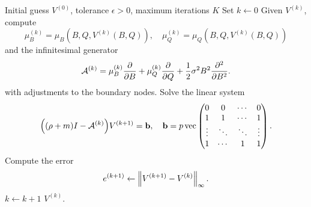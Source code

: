 
\begin{algorithmic}[1]
\Require Initial guess $V^{(0)}$, tolerance $\epsilon>0$, maximum iterations $K$
\State Set $k \gets 0$
\Repeat
    \State Given $V^{(k)}$, compute 
    \begin{equation*}
        \mu_B^{(k)} = \mu_B(B, Q, V^{(k)}(B, Q)), \quad \mu_Q^{(k)} = \mu_Q(B, Q, V^{(k)}(B, Q))
    \end{equation*}
    and the infinitesimal generator 
    \begin{equation*}
        \mathcal{A}^{(k)} = \mu_B^{(k)}\frac{\partial{}}{\partial{B}} + \mu_Q^{(k)}\frac{\partial{}}{\partial{Q}} + \frac{1}{2}\sigma^2B^2\frac{\partial^2{}}{\partial{B}^2}.
    \end{equation*}
    with adjustments to the boundary nodes. 
    \State Solve the linear system 
    \begin{equation*}
        \pth{(\rho+m)I - \A^{(k)}}V^{(k+1)} = \mathbf{b}, \quad 
        \mathbf{b} = p\operatorname{vec}\begin{pmatrix}
            0 & 0 & \cdots & 0 \\ 
            1 & 1 & \cdots & 1 \\ 
            \vdots & \ddots & \ddots & \vdots \\ 
            1 & \cdots & 1 & 1
        \end{pmatrix}.
    \end{equation*}
    \State Compute the error 
    \begin{equation*}
        e^{(k+1)} \gets \left\lVert {V^{(k+1)} - V^{(k)}} \right\rVert_\infty.
    \end{equation*}
    \State $k \gets k+1$
\State \Return $V^{(k)}$. 
\end{algorithmic}
